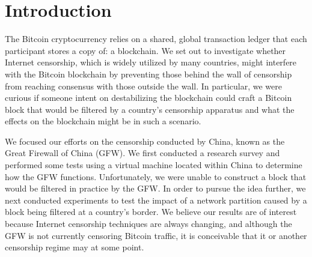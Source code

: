 \section{Introduction}
The Bitcoin cryptocurrency relies on a shared, global transaction ledger that each participant stores a copy of: a blockchain. We set out to investigate whether Internet censorship, which is widely utilized by many countries, might interfere with the Bitcoin blockchain by preventing those behind the wall of censorship from reaching consensus with those outside the wall. In particular, we were curious if someone intent on destabilizing the blockchain could craft a Bitcoin block that would be filtered by a country's censorship apparatus and what the effects on the blockchain might be in such a scenario.

We focused our efforts on the censorship conducted by China, known as the Great Firewall of China (GFW). We first conducted a research survey and performed some tests using a virtual machine located within China to determine how the GFW functions. Unfortunately, we were unable to construct a block that would be filtered in practice by the GFW. In order to pursue the idea further, we next conducted experiments to test the impact of a network partition caused by a block being filtered at a country's border. We believe our results are of interest because Internet censorship techniques are always changing, and although the GFW is not currently censoring Bitcoin traffic, it is conceivable that it or another censorship regime may at some point.
